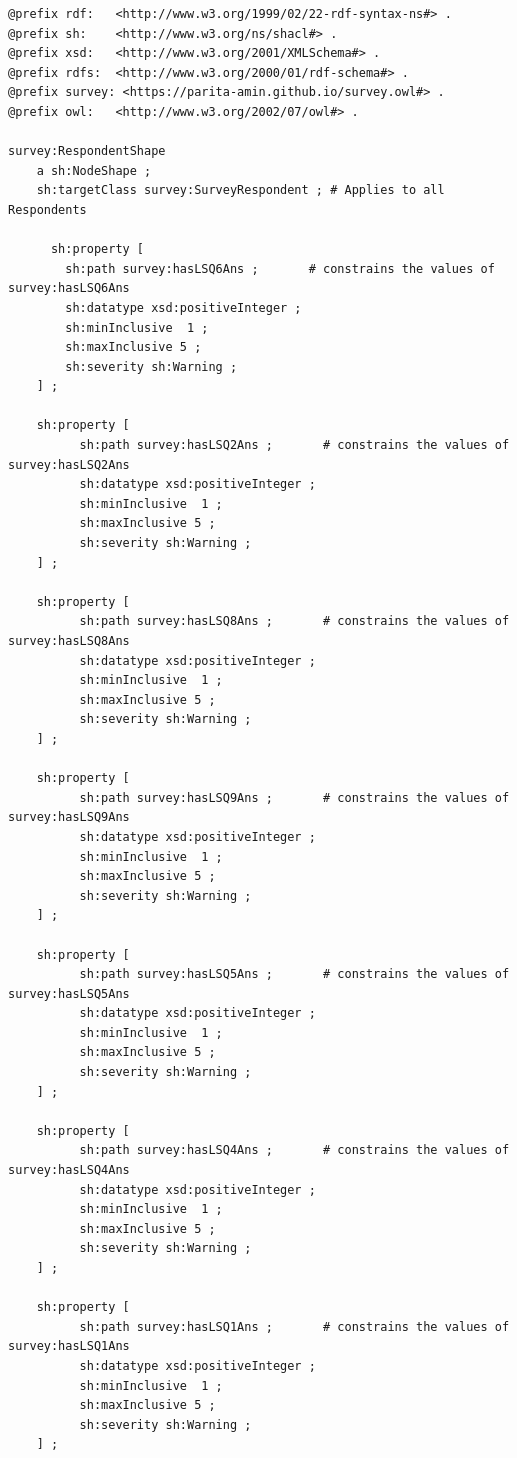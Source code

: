 \begin{lstlisting}
@prefix rdf:   <http://www.w3.org/1999/02/22-rdf-syntax-ns#> .
@prefix sh:    <http://www.w3.org/ns/shacl#> .
@prefix xsd:   <http://www.w3.org/2001/XMLSchema#> .
@prefix rdfs:  <http://www.w3.org/2000/01/rdf-schema#> .
@prefix survey: <https://parita-amin.github.io/survey.owl#> .
@prefix owl:   <http://www.w3.org/2002/07/owl#> .

survey:RespondentShape
    a sh:NodeShape ;
    sh:targetClass survey:SurveyRespondent ; # Applies to all Respondents

	  sh:property [
        sh:path survey:hasLSQ6Ans ;       # constrains the values of survey:hasLSQ6Ans
        sh:datatype xsd:positiveInteger ;
        sh:minInclusive  1 ;
        sh:maxInclusive 5 ;
        sh:severity sh:Warning ;
    ] ;

    sh:property [
          sh:path survey:hasLSQ2Ans ;       # constrains the values of survey:hasLSQ2Ans
          sh:datatype xsd:positiveInteger ;
          sh:minInclusive  1 ;
          sh:maxInclusive 5 ;
          sh:severity sh:Warning ;
    ] ;

    sh:property [
          sh:path survey:hasLSQ8Ans ;       # constrains the values of survey:hasLSQ8Ans
          sh:datatype xsd:positiveInteger ;
          sh:minInclusive  1 ;
          sh:maxInclusive 5 ;
          sh:severity sh:Warning ;
    ] ;

    sh:property [
          sh:path survey:hasLSQ9Ans ;       # constrains the values of survey:hasLSQ9Ans
          sh:datatype xsd:positiveInteger ;
          sh:minInclusive  1 ;
          sh:maxInclusive 5 ;
          sh:severity sh:Warning ;
    ] ;

    sh:property [
          sh:path survey:hasLSQ5Ans ;       # constrains the values of survey:hasLSQ5Ans
          sh:datatype xsd:positiveInteger ;
          sh:minInclusive  1 ;
          sh:maxInclusive 5 ;
          sh:severity sh:Warning ;
    ] ;

    sh:property [
          sh:path survey:hasLSQ4Ans ;       # constrains the values of survey:hasLSQ4Ans
          sh:datatype xsd:positiveInteger ;
          sh:minInclusive  1 ;
          sh:maxInclusive 5 ;
          sh:severity sh:Warning ;
    ] ;

    sh:property [
          sh:path survey:hasLSQ1Ans ;       # constrains the values of survey:hasLSQ1Ans
          sh:datatype xsd:positiveInteger ;
          sh:minInclusive  1 ;
          sh:maxInclusive 5 ;
          sh:severity sh:Warning ;
    ] ;


\end{lstlisting}
